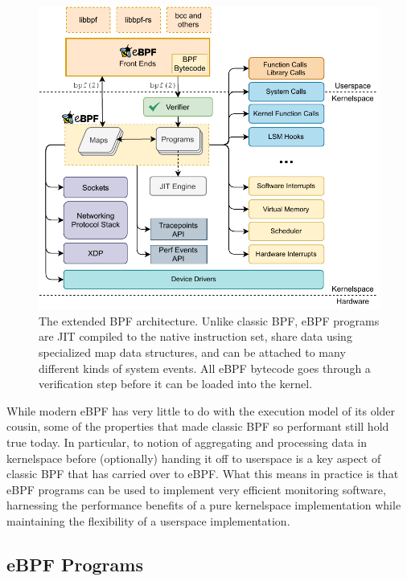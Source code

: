 \begin{figure}[tbp]
  \centering
  \includegraphics[width=0.8\linewidth]{figs/background/ebpf.pdf}
  \caption[The extended BPF architecture]{The extended BPF architecture. Unlike classic
  BPF, eBPF programs are JIT compiled to the native instruction set, share data using
  specialized map data structures, and can be attached to many different kinds of system
  events. All eBPF bytecode goes through a verification step before it can be loaded into
  the kernel.}%
  \label{fig:extended-bpf}
\end{figure}

While modern eBPF has very little to do with the execution model of its older cousin, some
of the properties that made classic BPF so performant still hold true today. In
particular, to notion of aggregating and processing data in kernelspace before
(optionally) handing it off to userspace is a key aspect of classic BPF that has carried
over to eBPF. What this means in practice is that eBPF programs can be used to implement
very efficient monitoring software, harnessing the performance benefits of a pure
kernelspace implementation while maintaining the flexibility of a userspace
implementation.

\subsection{eBPF Programs}%
\label{ss:bpf-programs-bg}

